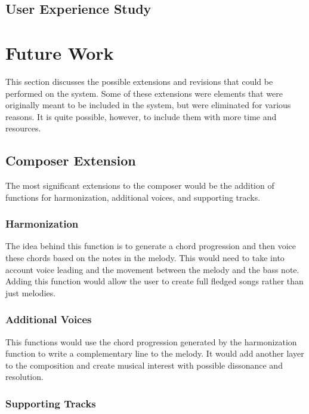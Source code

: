 \subsection{User Experience Study}
\label{subsec:summaryofresultsuserexperiencestudy}



\section{Future Work}
\label{sec:futurework}

This section discusses the possible extensions and revisions that could be performed on the system.  Some of these extensions were elements that were originally meant to be included in the system, but were eliminated for various reasons.  It is quite possible, however, to include them with more time and resources.

\subsection{Composer Extension}
\label{subsec:composerextension}

The most significant extensions to the composer would be the addition of functions for harmonization, additional voices, and supporting tracks.

\subsubsection{Harmonization}
\label{subsubsec:harmonization}

The idea behind this function is to generate a chord progression and then voice these chords based on the notes in the melody.  This would need to take into account voice leading and the movement between the melody and the bass note.  Adding this function would allow the user to create full fledged songs rather than just melodies.

\subsubsection{Additional Voices}
\label{subsubsec:additionalvoices}

This functions would use the chord progression generated by the harmonization function to write a complementary line to the melody.  It would add another layer to the composition and create musical interest with possible dissonance and resolution.

\subsubsection{Supporting Tracks}
\label{subsubsec:supportingtracks}

